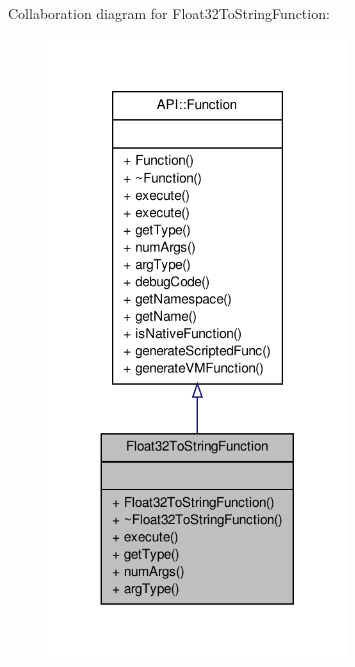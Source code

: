 Collaboration diagram for Float32\-To\-String\-Function\-:
\nopagebreak
\begin{figure}[H]
\begin{center}
\leavevmode
\includegraphics[width=224pt]{class_float32_to_string_function__coll__graph}
\end{center}
\end{figure}
